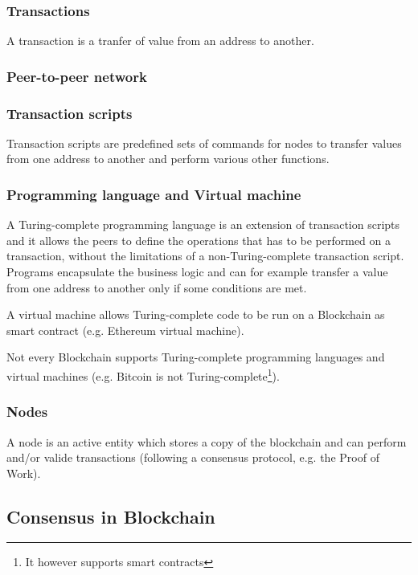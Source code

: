 \subsubsection*{Transactions}
A transaction is a tranfer of value from an address to another.


\subsubsection*{Peer-to-peer network}


\subsubsection*{Transaction scripts}
Transaction scripts are predefined sets of commands for nodes to transfer values
from one address to another and perform various other functions.


\subsubsection*{Programming language and Virtual machine}
A Turing-complete programming language is an extension of transaction scripts and
it allows the peers to define the operations that has to be performed on a
transaction, without the limitations of a non-Turing-complete transaction script.
Programs encapsulate the business logic and can for example transfer a value
from one address to another only if some conditions are met.

A virtual machine allows Turing-complete code to be run on a Blockchain as
smart contract (e.g. Ethereum virtual machine).

Not every Blockchain supports Turing-complete programming languages and virtual
machines (e.g. Bitcoin is not Turing-complete\footnote{It however supports
smart contracts}).


\subsubsection*{Nodes}
A node is an active entity which stores a copy of the blockchain and can perform
and/or valide transactions (following a consensus protocol, e.g. the Proof of Work).









\subsection{Consensus in Blockchain}









